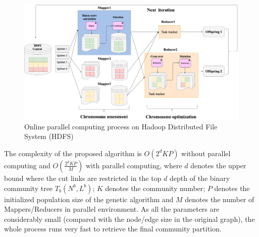\begin{figure}  
	\center
	\includegraphics[width=1\columnwidth]{img/chapter3/parallel.png}
	\caption{Online parallel computing process on Hadoop Distributed File System (HDFS)}
	\label{fig:distributed}
\end{figure}

The complexity of the proposed algorithm is $O(2^dKP)$ without parallel computing and $O(\frac{2^dKP}{M})$ with  parallel computing, where $d$ denotes the upper bound where the cut links are restricted in the top $d$ depth of the binary community tree $T_{b}(N^{b},L^{b})$; $K$ denotes the community number; $P$ denotes the initialized population size of the genetic algorithm and $M$ denotes the number of Mappers/Reducers in parallel environment. As all the parameters are considerably small (compared with the node/edge size in the original graph), the whole process runs very fast to retrieve the final community partition.